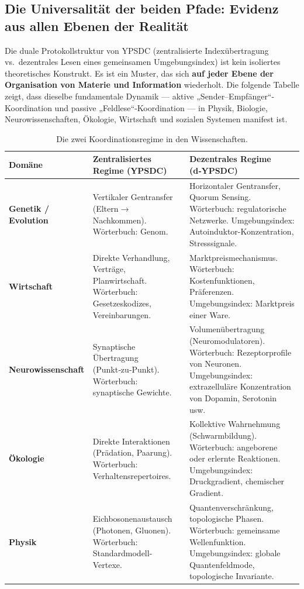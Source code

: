 \documentclass[11pt,a4paper]{article}
\begin{document}
	\subsection{Die Universalität der beiden Pfade: Evidenz aus allen Ebenen der Realität}
	\label{subsec:universality-two-paths}
	
	Die duale Protokollstruktur von YPSDC (zentralisierte Indexübertragung vs.\ dezentrales Lesen eines gemeinsamen Umgebungsindex) ist kein isoliertes theoretisches Konstrukt. Es ist ein Muster, das sich \textbf{auf jeder Ebene der Organisation von Materie und Information} wiederholt. Die folgende Tabelle zeigt, dass dieselbe fundamentale Dynamik — aktive „Sender–Empfänger“-Koordination und passive „Feldlese“-Koordination — in Physik, Biologie, Neurowissenschaften, Ökologie, Wirtschaft und sozialen Systemen manifest ist.
	
	\begin{table}[htbp]
		\centering
		\caption{Die zwei Koordinationsregime in den Wissenschaften.}
		\label{tab:two-regimes-sciences}
		\large
		\begin{tabular}{p{3.0cm}p{5.5cm}p{6.5cm}}
			\toprule
			\textbf{Domäne} & \textbf{Zentralisiertes Regime (YPSDC)} & \textbf{Dezentrales Regime (d‑YPSDC)} \\
			\midrule
			\textbf{Genetik / Evolution} &
			Vertikaler Gentransfer (Eltern$\to$Nachkommen).
			Wörterbuch: Genom. &
			Horizontaler Gentransfer, Quorum Sensing.
			Wörterbuch: regulatorische Netzwerke.
			Umgebungsindex: Autoinduktor-Konzentration, Stresssignale. \\
			\midrule
			\textbf{Wirtschaft} &
			Direkte Verhandlung, Verträge, Planwirtschaft.
			Wörterbuch: Gesetzeskodizes, Vereinbarungen. &
			Marktpreismechanismus.
			Wörterbuch: Kostenfunktionen, Präferenzen.
			Umgebungsindex: Marktpreis einer Ware. \\
			\midrule
			\textbf{Neurowissenschaft} &
			Synaptische Übertragung (Punkt‑zu‑Punkt).
			Wörterbuch: synaptische Gewichte. &
			Volumenübertragung (Neuromodulatoren).
			Wörterbuch: Rezeptorprofile von Neuronen.
			Umgebungsindex: extrazelluläre Konzentration von Dopamin, Serotonin usw. \\
			\midrule
			\textbf{Ökologie} &
			Direkte Interaktionen (Prädation, Paarung).
			Wörterbuch: Verhaltensrepertoires. &
			Kollektive Wahrnehmung (Schwarmbildung).
			Wörterbuch: angeborene oder erlernte Reaktionen.
			Umgebungsindex: Druckgradient, chemischer Gradient. \\
			\midrule
			\textbf{Physik} &
			Eichbosonenaustausch (Photonen, Gluonen).
			Wörterbuch: Standardmodell-Vertexe. &
			Quantenverschränkung, topologische Phasen.
			Wörterbuch: gemeinsame Wellenfunktion.
			Umgebungsindex: globale Quantenfeldmode, topologische Invariante. \\
			\bottomrule
		\end{tabular}
	\end{table}
	
\end{document}
